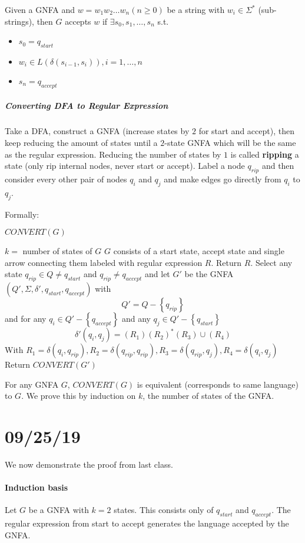 \documentclass[12 pt]{article}
\begin{document}
Given a GNFA and $w = w_1w_2 \ldots w_n (n \geq 0)$ be a string with
$w_i \in \Sigma^*$ (sub-strings), then $G$ accepts $w$ if $\exists s_0,s_1, \ldots,
s_n$ s.t.\
\begin{itemize}
\item $s_0 = q_{start}$
\item $w_i \in L(\delta(s_{i-1}, s_i)), i = 1, \ldots, n$
\item $s_n = q_{accept}$
\end{itemize}
\subparagraph{Converting DFA to Regular Expression}
Take a DFA, construct a GNFA (increase states by $2$ for start and
accept), then keep reducing the amount of states until a $2$-state
GNFA which will be the same as the regular expression. Reducing the
number of states by $1$ is called \textbf{ripping} a state (only rip
internal nodes, never start or accept). Label a node $q_{rip}$ and
then consider every other pair of nodes $q_i$ and $q_j$ and make edges
go directly from $q_i$ to $q_j$.

Formally:
\begin{algorithm}[H]
  $CONVERT(G)$
  \begin{algorithmic}
    \State $k =$ number of states of $G$
    \State $G$ consists of a start state, accept state
    and single arrow connecting them labeled with regular expression
    $R$. Return $R$.
    \EndIf
    \State Select any state $q_{rip} \in Q \neq q_{start}$ and
    $q_{rip} \neq q_{accept}$ and let $G'$ be the GNFA $(Q', \Sigma,
    \delta', q_{start},q_{accept})$ with
    $$Q' = Q - \left\{q_{rip}\right\}$$
    \State and for any $q_i \in Q' - \left\{q_{accept}\right\}$ and
    any $q_j \in Q' - \left\{q_{start}\right\}$
    $$\delta'(q_i,q_j) = (R_1)(R_2)^*(R_3)\cup (R_4)$$
    \State With $R_1 = \delta(q_i, q_{rip}), R_2 = \delta(q_{rip},
    q_{rip}), R_3 = \delta(q_{rip},q_j), R_4 = \delta(q_i,q_j)$
    \EndIf
    \State Return $CONVERT(G')$
  \end{algorithmic}
\end{algorithm}

For any GNFA $G$, $CONVERT(G)$ is equivalent (corresponds to same language) to $G$. We prove this by
induction on $k$, the number of states of the GNFA.
\section{09/25/19}
We now demonstrate the proof from last class.
\paragraph{Induction basis} Let $G$ be a GNFA with $k=2$ states. This
consists only of $q_{start}$ and $q_{accept}$. The regular expression
from start to accept generates the language accepted by the GNFA.
\end{document}
